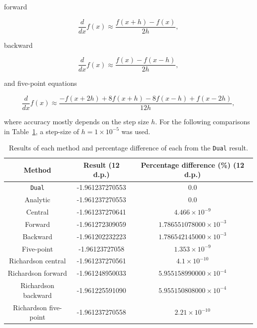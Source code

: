 \documentclass[11pt,a4paper]{article}
\begin{document}
forward

\begin{equation}
    \frac{d}{dx} f(x) \approx \frac{f(x+h) - f(x)}{2h},
\end{equation}

backward

\begin{equation}
    \frac{d}{dx} f(x) \approx \frac{f(x) - f(x-h)}{2h},
\end{equation}

and five-point equations

\begin{equation}
    \frac{d}{dx} f(x) \approx \frac{-f(x+2h) + 8 f(x+h) - 8 f(x-h) + f(x-2h)}{12h},
\end{equation}

where accuracy mostly depends on the step size $h$. For the following comparisons in Table~\ref{tab:diffs}, a step-size of $h=1 \times 10^{-5}$ was used.

\begin{table}
    \centering
    \begin{tabular}{c|c|c}
        Method & Result (12 d.p.) & Percentage difference (\%) (12 d.p.)\\
        \hline
        \texttt{Dual} & -1.961237270553 & $0.0$\\
        Analytic & -1.961237270553 & $0.0$\\
        \hline
        Central & -1.961237270641 & $4.466\times 10^{-9}$\\
        Forward & -1.961272309059 & $1.786551078000\times 10^{-3}$\\
        Backward & -1.961202232223 & $1.786542145000 \times 10^{-3}$\\
        Five-point & -1.96123727058 & $1.353\times 10^{-9}$\\
        \hline
        Richardson central & -1.961237270561 & $4.1\times 10^{-10}$\\
        Richardson forward & -1.961248950033 & $5.955158990000\times 10^{-4}$\\
        Richardson backward & -1.961225591090 & $5.955150808000\times 10^{-4}$\\
        Richardson five-point & -1.961237270558 & $2.21\times 10^{-10}$
    \end{tabular}
    \caption{Results of each method and percentage difference of each from the \texttt{Dual} result.}
    \label{tab:diffs}
\end{table}
\end{document}
